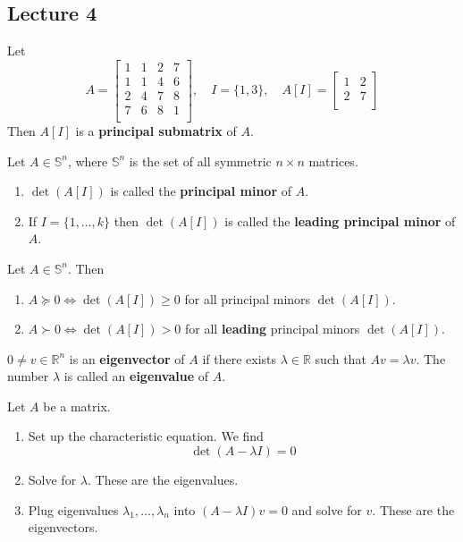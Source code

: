 \subsection{Lecture 4}

\begin{definition}
  Let $$A = \begin{bmatrix}
    1 & 1 & 2 & 7 \\
    1 & 1 & 4 & 6 \\
    2 & 4 & 7 & 8 \\
    7 & 6 & 8 & 1 \\
  \end{bmatrix}, \quad I = \{1,3\}, \quad A[I] = \begin{bmatrix}
    1 & 2 \\
    2 & 7 \\
  \end{bmatrix}$$
  Then $A[I]$ is a \textbf{principal submatrix} of $A$.
\end{definition}
\begin{definition}
  Let $A \in \mathbb S^n$, where $\mathbb S^n$ is the set of all symmetric $n \times n$ matrices.
\begin{enumerate}
  \item $\det(A[I])$ is called the \textbf{principal minor} of $A$.
  \item If $I = \{1,\ldots, k\}$ then $\det(A[I])$ is called the \textbf{leading principal minor} of $A$.
\end{enumerate}
\end{definition}
\begin{proposition}
  Let $A \in \mathbb S^n$. Then
  \begin{enumerate}
    \item $A \succeq 0 \iff \det(A[I]) \geq 0$ for all principal minors $\det(A[I])$.
    \item $A \succ 0 \iff \det(A[I]) > 0$ for all \textbf{leading} principal minors $\det(A[I])$.
  \end{enumerate}
\end{proposition}
\begin{definition}
  $0 \neq v \in \mathbb R^n$ is an \textbf{eigenvector} of $A$ if there exists $\lambda \in \mathbb R$ such that $Av = \lambda v$. The number $\lambda$ is called an \textbf{eigenvalue} of $A$.
\end{definition}
\begin{theorem}
  Let $A$ be a matrix.
  \begin{enumerate}
    \item Set up the characteristic equation. We find $$\det(A - \lambda I) = 0$$
    \item Solve for $\lambda$. These are the eigenvalues.
    \item Plug eigenvalues $\lambda_1,\ldots, \lambda_n$ into $(A - \lambda I)v = 0$ and solve for $v$. These are the eigenvectors.
  \end{enumerate}
\end{theorem}

